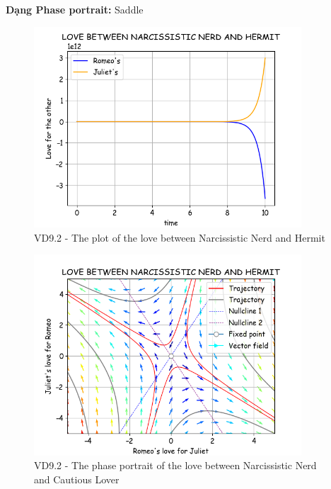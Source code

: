 \textbf{Dạng Phase portrait: } Saddle
\pagebreak
\begin{figure}[!htbp]
    \centering
    \includegraphics[width=100mm]{image/bt2/plot9.2.png}
    \caption{VD9.2 - The plot of the love between Narcissistic Nerd and Hermit}
\end{figure}
\begin{figure}[!htbp]
    \centering
    \includegraphics[width=100mm]{image/bt2/pp9.2.png}
    \caption{VD9.2 - The phase portrait of the love between Narcissistic Nerd and Cautious Lover}
\end{figure}

